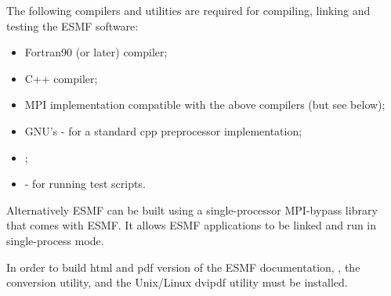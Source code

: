 

The following compilers and utilities are required for compiling, linking and
testing the ESMF software:
\begin{itemize}
\item Fortran90 (or later) compiler;
\item C++ compiler;
\item MPI implementation compatible with the above compilers (but see below);
\item GNU's  -
for a standard cpp preprocessor implementation;
\item {}; 
\item {} - for running
test scripts.
\end{itemize} 

Alternatively ESMF can be built using a single-processor MPI-bypass library
that comes with ESMF. It allows ESMF applications to be linked and run in
single-process mode.

In order to build html and pdf version of the ESMF documentation, 
, the  conversion utility, and the Unix/Linux dvipdf utility must be installed.
